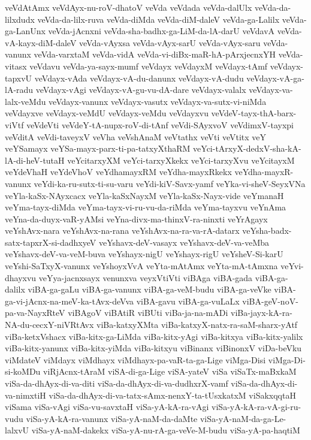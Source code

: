 {veVdAtAmx
veVdAyx-nu-roV-dhatoV
veVda
veVdada
veVda-dalUlx
veVda-da-lilxdudx
veVda-da-lilx-ruva
veVda-diMda
veVda-diM-daleV
veVda-ga-Lalilx
veVda-ga-LanUnx
veVda-jAcnxni
veVda-sha-badhx-ga-LiM-da-lA-darU
veVdavA
veVda-vA-kayx-diM-daleV
veVda-vAyxsa
veVda-vAyx-sarU
veVda-vAyx-saru
veVda-vanunx
veVda-varxtaM
veVda-vidA
veVda-vi-diBx-maR-hA-pArxjecnxYH
veVda-vitasx
veVdavu
veVda-ya-sayx-mumf
veVdayx
veVdayxM
veVdayx-tAmf
veVdayx-tapxvU
veVdayx-vAda
veVdayx-vA-du-danunx
veVdayx-vA-dudu
veVdayx-vA-ga-lA-radu
veVdayx-vAgi
veVdayx-vA-gu-vu-dA-dare
veVdayx-valalx
veVdayx-va-lalx-veMdu
veVdayx-vanunx
veVdayx-vasutx
veVdayx-va-sutx-vi-niMda
veVdayxve
veVdayx-veMdU
veVdayx-veMdu
veVdayxvu
veVdeV-tayx-thA-barx-viVtf
veVdeVti
veVdeY-tA-nupx-roV-di-tAnf
veVdi-SAyxvoV
veVdimxV-tayxpi
veVditA
veVdi-taveyxV
veVha
veVshAnaM
veVtathx
veVti
veVtitx
veY
veYSamayx
veYSa-mayx-parx-ti-pa-tatxyXthaRM
veYci-tArxyX-dedxV-sha-kA-lA-di-heV-tutaH
veYcitarxyXM
veYci-tarxyXkekx
veYci-tarxyXvu
veYcitayxM
veYdeVhaH
veYdeVhoV
veYdhamayxRM
veYdha-mayxRkekx
veYdha-mayxR-vanunx
veYdi-ka-ru-sutx-ti-su-varu
veYdi-kiV-Savx-yamf
veYka-vi-sheV-SeyxVNa
veYla-kaSx-NAyxcacx
veYla-kaSxNayxM
veYla-kaSx-Nayx-vide
veYmanaH
veYma-tayx-diMda
veYma-tayx-vi-ru-vu-da-riMda
veYma-tayxvu
veYnAma
veYna-da-duyx-vaR-yAMsi
veYna-divx-ma-thinxV-ra-ninxti
veYrAgayx
veYshAvx-nara
veYshAvx-na-rana
veYshAvx-na-ra-va-rA-datarx
veYsha-badx-satx-tapxrX-si-dadhxyeV
veYshavx-deV-vasayx
veYshavx-deV-va-veMba
veYshavx-deV-va-veM-buva
veYshayx-nigU
veYshayx-rigU
veYsheV-Si-karU
veYshi-SaTxyX-vanunx
veYshoyxVvA
veYta-mAtAmx
veYta-mA-tAmxna
veYvi-dhayxvu
veYya-jacnxsayx
venunxva
veyxVtiVti
viBAga
viBA-gada
viBA-ga-dalilx
viBA-ga-gaLu
viBA-ga-vanunx
viBA-ga-veM-budu
viBA-ga-veVke
viBA-ga-vi-jAcnx-na-meV-ka-tAvx-deVva
viBA-gavu
viBA-ga-vuLaLx
viBA-geV-noV-pa-va-NayxRteV
viBAgoV
viBAtiR
viBUti
viBa-ja-na-mADi
viBa-jayx-kA-ra-NA-du-cecxY-niVRtAvx
viBa-katxyXMta
viBa-katxyX-natx-ra-saM-sharx-yAtf
viBa-ketxVshacx
viBa-kitx-ga-LiMda
viBa-kitx-yAgi
viBa-kitxya
viBa-kitx-yalilx
viBa-kitx-yanunx
viBa-kitx-yiMda
viBa-kitxyu
viBinanx
viBinonxV
viDa-beVku
viMdateV
viMdayx
viMdhayx
viMdhayx-pa-vaR-ta-ga-Lige
viMga-Disi
viMga-Di-si-koMDu
viRjAcnx-tAraM
viSA-di-ga-Lige
viSA-yateV
viSa
viSaTx-maBxkaM
viSa-da-dhAyx-di-va-diti
viSa-da-dhAyx-di-va-dudhxrX-vamf
viSa-da-dhAyx-di-va-nimxtiH
viSa-da-dhAyx-di-va-tatx-sAmx-nenxY-ta-tUsxkatxM
viSakxqqtaH
viSama
viSa-vAgi
viSa-vu-savxtaH
viSa-yA-kA-ra-vAgi
viSa-yA-kA-ra-vA-gi-ru-vudu
viSa-yA-kA-ra-vanunx
viSa-yA-naM-da-daMte
viSa-yA-naM-da-ga-Le-lalxvU
viSa-yA-naM-dakekx
viSa-yA-nu-rA-ga-veVe-M-budu
viSa-yA-pa-haqtiM
}
